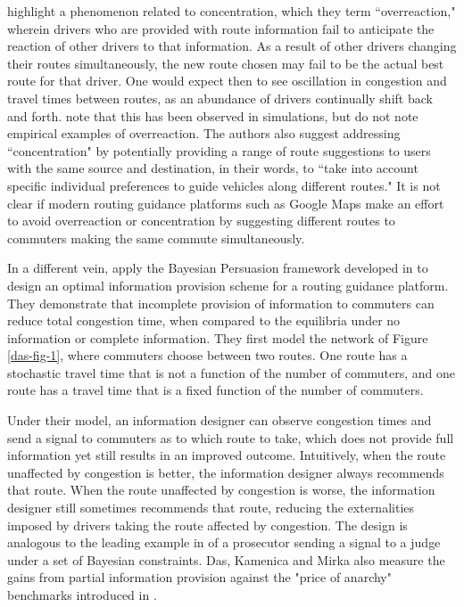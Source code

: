 \documentclass[JEL]{AEA}
\begin{document}
\cite{ben-akiva-1991} highlight a phenomenon related to concentration, which they term ``overreaction," wherein drivers who are provided with route information fail to anticipate the reaction of other drivers to that information. As a result of other drivers changing their routes simultaneously, the new route chosen may fail to be the actual best route for that driver. One would expect then to see oscillation in congestion and travel times between routes, as an abundance of drivers continually shift back and forth. \cite{ben-akiva-1991} note that this has been observed in simulations, but do not note empirical examples of overreaction. The authors also suggest addressing ``concentration" by potentially providing a range of route suggestions to users with the same source and destination, in their words, to ``take into account specific individual preferences to guide vehicles along different routes." It is not clear if modern routing guidance platforms such as Google Maps make an effort to avoid overreaction or concentration by suggesting different routes to commuters making the same commute simultaneously.

In a different vein, \cite{das-2017} apply the Bayesian Persuasion framework developed in \cite{kamenica-2011} to design an optimal information provision scheme for a routing guidance platform. They demonstrate that incomplete provision of information to commuters can reduce total congestion time, when compared to the equilibria under no information or complete information. They first model the network of Figure \ref{das-fig-1}, where commuters choose between two routes. One route has a stochastic travel time that is not a function of the number of commuters, and one route has a travel time that is a fixed function of the number of commuters. 

Under their model, an information designer can observe congestion times and send a signal to commuters as to which route to take, which does not provide full information yet still results in an improved outcome. Intuitively, when the route unaffected by congestion is better, the information designer always recommends that route. When the route unaffected by congestion is worse, the information designer still sometimes recommends that route, reducing the externalities imposed by drivers taking the route affected by congestion. The design is analogous to the leading example in \cite{kamenica-2011} of a prosecutor sending a signal to a judge under a set of Bayesian constraints. Das, Kamenica and Mirka also measure the gains from partial information provision against the "price of anarchy" benchmarks introduced in \cite{roughgarden-2002}.
\end{document}
